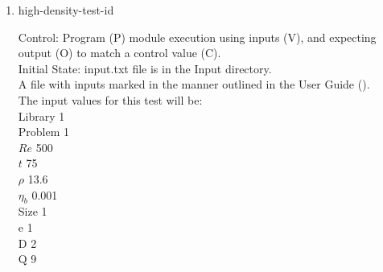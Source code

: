 \documentclass[12pt, titlepage]{article}
\newcommand{\famname}{Lattice Boltzmann Solver}
\newcounter{testcounter} %
\begin{document}
\begin{enumerate}
Output: Vorticity vector values printed to the screen. \\

Test Case Derivation: This case is a comparison with the pseudo-oracle
pyLBM. The C values of this test for pyLBM can be found in the file
id7output.txt located in the OracleOutput folder. The output values of {\famname} will be compared to the pseudo-oracle output values.\\

This test covers the low bound for density using a density of liquid hydrogen.\\
					
How test will be performed: 

\begin{enumerate}
\item The Von Karman Vortex Street module shall be modified by the author to
  print the vorticity vector as output.
\item Outside of the system, the input parameter values will be written to a text file titled input.txt, as outlined in Section \ref{ext4-inputs} of the User Guide.
\item The file will be placed into the Input directory, under the home directory of the project.
\item {\famname} shall be run.
\item Upon completion of the module, the output values of the vorticity vector
  will be compared to the vorticity vector values from pyLBM - comparison will
  be done per cell. Comparisons can be done manually using Excel, or through a
  script, using the equation for relative error found in Section \ref{eqerror}.
\end{enumerate}

\item{high-density-test-id\thetestcounter \\}

Control: Program (P) module execution using inputs (V), and expecting output (O)
to match a control value (C).\\

Initial State: input.txt file is in the Input directory.\\
					
A file with inputs marked in the manner outlined in the User
Guide (\citet{LBM_UserGuide_PM}).\\The input values for this test will be:\\
  Library 1\\
Problem 1\\
$Re$ 500\\
$t$ 75\\
$\rho$ 13.6\\
$\eta_b$ 0.001\\
Size 1\\
$\mathrm{e}$ 1\\
$\mathrm{D}$ 2\\
$\mathrm{Q}$ 9\\


\end{enumerate}
\end{document}
